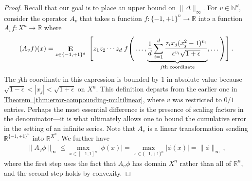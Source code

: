 \documentclass[10pt]{article}
\theoremstyle{definition}
\numberwithin{equation}{section}
\newcommand{\R}{{\mathbb R}}
\newcommand{\expref}[2]{\texorpdfstring{\hyperref[#2]{#1~\ref{#2}}}{#1~\ref{#2}}}
\newcommand{\moo}{\{-1,+1\}}
\newcommand{\moon}{\moo^n}
\DeclareMathOperator*{\Exp}{\mathbf{E}}
\begin{document}
\begin{proof}
Recall that our goal is to
place an upper bound on $\|\Delta\|_\infty$. 
For $v\in\mathbb N^d,$ 
consider the operator $A_v$ that
takes a function $f\colon\moon\to\R$ into a function
$A_vf\colon X^n\to\R$ where 
\begin{align*}
(A_vf)(x) = 
\Exp_{z\in\moo^d} \;\left[\rule{0mm}{7mm}
z_1z_2\cdots z_d\;f
\right(
\dots,
\underbrace{\frac1d\sum_{i=1}^d
\frac{z_ix_j(x_j^2-1)^{v_i}}{\epsilon^{v_i}
\sqrt{1+\epsilon}}}_{\text{$j$th
coordinate}}
,\dots\left)\rule{0mm}{7mm}
\rule{0mm}{6mm}\right].
\end{align*}
The $j$th coordinate in this expression is bounded by 
$1$ in absolute value because
$\sqrt{1-\epsilon}<|x_j|<\sqrt{1+\epsilon}$ on $X^n$.
This definition departs from the earlier
one in \expref{Theorem}{thm:error-compounding-multilinear},
where $v$ was restricted to $0/1$ entries. Perhaps the most
essential difference is the presence of scaling
factors in the denominator---it is what ultimately
allows one to bound the cumulative error in the setting
of an infinite series. Note that $A_v$ is a linear
transformation sending $\R^{\moon}$ into $\R^{X^n}$. 
We further have
\begin{align}
\|A_v\phi\|_\infty \leq
\max_{x\in[-1,1]^n}|\phi(x)| = 
\max_{x\in\moon}|\phi(x)| = \|\phi\|_\infty\,,
\label{eqn:A_v-small-Rn}
\end{align}
where the first step uses the fact that $A_v\phi$ has
domain $X^n$ rather than all of $\R^n,$ and the second step holds by convexity. 


\end{proof}
\end{document}
